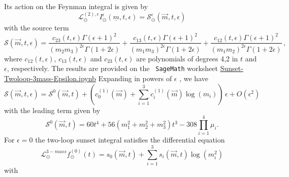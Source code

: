 \documentclass[a4paper,12pt]{article}
\numberwithin{equation}{section}
\numberwithin{figure}{section}
\def\su{\circleddash}
\begin{document}
Its action on the Feynman integral is given by 
\begin{equation}
     \mathscr{L}^{(2),\epsilon}_\su  I_\su^\epsilon(\underline
     m,t,\epsilon)=\mathscr{S}^\epsilon_\su(\vec m,t,\epsilon) 
   \end{equation}
   with the source term
   \begin{equation}
     \mathscr{S}(\vec m,t,\epsilon)=\frac{c_{23}(t,\epsilon)\Gamma (\epsilon +1)^2}{ (m_{2} m_{3})^{2 \epsilon}\Gamma (1+2\epsilon)}+\frac{c_{13}(t,\epsilon)\Gamma (\epsilon +1)^2}{ (m_{1} m_{3})^{2 \epsilon }\Gamma (1+2
   \epsilon)}+\frac{c_{12}(t,\epsilon)\Gamma (\epsilon +1)^2}{ (m_{1} m_{2})^{2 \epsilon }\Gamma (1+2
   \epsilon )} \, , 
\end{equation}
where $c_{12}(t,\epsilon)$, $c_{13}(t,\epsilon)$ and
$c_{23}(t,\epsilon)$ are polynomials of degrees 4,2 in $t$ and
$\epsilon$, respectively. The results are provided on the {\tt
  SageMath} worksheet \href{Sunset-Twoloop-3mass-Epsilon.ipynb}{Sunset-Twoloop-3mass-Epsilon.ipynb}
%
Expanding in powers of $\epsilon$ , we have
%
\begin{equation}
    \mathscr{S}(\vec m,t,\epsilon)=\mathscr{S}^0(\vec m,t)
    +\left(c^{(1)}_0(\vec m)+
    \sum_{i=1}^3  c^{(1)}_i(\vec m)\log(m_i)\right)\,  \epsilon+O(\epsilon^2)
\end{equation}
with  the leading term given by
   \begin{equation}
   \mathscr{S}^0(\vec m,t)=60 t^{4}+56\left( m_{1}^{2}+ m_{2}^{2}+
     m_{3}^{2}\right) t^{3}
   -308 \prod_{i=1}^4 \mu_i.
 \end{equation}
For $\epsilon=0$ the two-loop sunset integral satisfies  the
differential equation
\begin{equation}
  \mathscr{L}^{3-mass}_\su f_\su^{(0)}(t)= s_0(\vec m,t)+ \sum_{i=1}^3
  s_i(\vec m,t)\log(m_i^2)  
\end{equation}
with 
\end{document}
